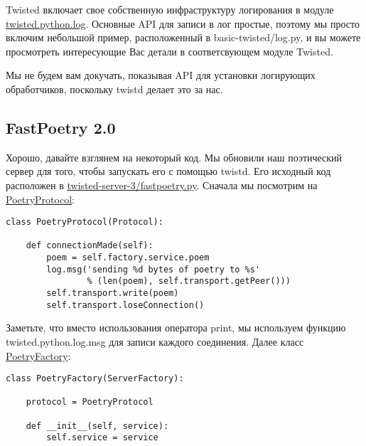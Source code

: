 Twisted включает свое собственную инфраструктуру логирования в модуле 
\href{http://twistedmatrix.com/trac/browser/tags/releases/twisted-10.0.0/twisted/python/log.py}{twisted.python.log}. Основные API для записи в лог простые, поэтому мы просто 
включим небольшой пример, расположенный в 
basic-twisted/log.py, и вы можете просмотреть интересующие Вас детали 
в соответсвующем модуле Twisted.


Мы не будем вам докучать, показывая API для установки логирующих 
обработчиков, поскольку twistd делает это за нас.

\subsection{FastPoetry 2.0}

Хорошо, давайте взглянем на некоторый код. Мы обновили 
наш поэтический сервер для того, чтобы запускать его с 
помощью twistd. Его исходный код расположен в 
\href{http://github.com/jdavisp3/twisted-intro/blob/master/twisted-server-3/fastpoetry.py#L1}{twisted-server-3/fastpoetry.py}. Сначала мы посмотрим на 
\href{http://github.com/jdavisp3/twisted-intro/blob/master/twisted-server-3/fastpoetry.py#L9}{PoetryProtocol}:

 \begin{verbatim}
class PoetryProtocol(Protocol):

    def connectionMade(self):
        poem = self.factory.service.poem
        log.msg('sending %d bytes of poetry to %s'
                % (len(poem), self.transport.getPeer()))
        self.transport.write(poem)
        self.transport.loseConnection()

\end{verbatim} 

Заметьте, что вместо использования оператора print, 
мы используем функцию twisted.python.log.msg для 
записи каждого соединения.
Далее класс \href{http://github.com/jdavisp3/twisted-intro/blob/master/twisted-server-3/fastpoetry.py#L19}{PoetryFactory}:

 \begin{verbatim}
class PoetryFactory(ServerFactory):

    protocol = PoetryProtocol

    def __init__(self, service):
        self.service = service
\end{verbatim} 


